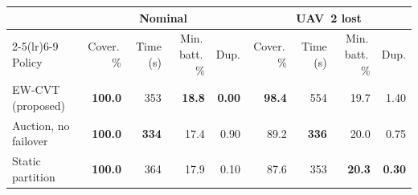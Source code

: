 \begin{tabular}{lrrrrrrrr}
\toprule
& \multicolumn{4}{c}{Nominal} & \multicolumn{4}{c}{UAV~2 lost}\\
\cmidrule(lr){2-5}\cmidrule(lr){6-9}
Policy & Cover.\,\% & Time (s) & Min.\,batt.\,\% & Dup. & Cover.\,\% & Time (s) & Min.\,batt.\,\% & Dup.\\
\midrule
EW-CVT (proposed) & \textbf{100.0} & 353 & \textbf{18.8} & \textbf{0.00} & \textbf{98.4} & 554 & 19.7 & 1.40 \\
Auction, no failover & \textbf{100.0} & \textbf{334} & 17.4 & 0.90 & 89.2 & \textbf{336} & 20.0 & 0.75 \\
Static partition & \textbf{100.0} & 364 & 17.9 & 0.10 & 87.6 & 353 & \textbf{20.3} & \textbf{0.30} \\
\bottomrule
\end{tabular}
